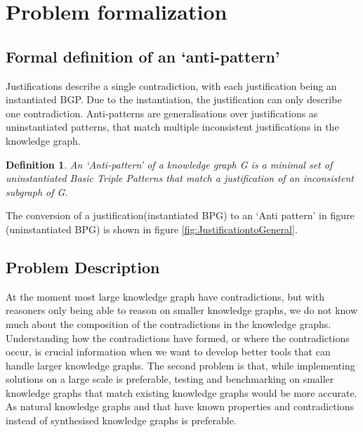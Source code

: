 \documentclass{article}
\newtheorem{definition}{Definition}
\begin{document}
\newpage
\section{Problem formalization}
\subsection{Formal definition of an `anti-pattern'}
Justifications describe a single contradiction, with each justification being an instantiated BGP. Due to the instantiation, the justification can only describe one contradiction. Anti-patterns are generalisations over justifications as uninstantiated patterns, that match  multiple inconsistent justifications in the knowledge graph. 

\begin{definition} 
	An \textit{`Anti-pattern'} \textit{of a knowledge graph G is a minimal set of uninstantiated Basic Triple Patterns that match a justification of an inconsistent subgraph of G.}
\end{definition}

The conversion of a justification(instantiated BPG) to an `Anti pattern' in figure (uninstantiated BPG) is shown in figure  \ref{fig:JustificationtoGeneral}.

\subsection{Problem Description}
At the moment most large knowledge graph have contradictions, but with reasoners only being able to reason on smaller knowledge graphs, we do not know much about the composition of the contradictions in the knowledge graphs. Understanding how the contradictions have formed, or where the contradictions occur, is crucial information when we want to develop better tools that can handle larger knowledge graphs. The second problem is that, while implementing solutions on a large scale is preferable, testing and benchmarking on smaller knowledge graphs that match existing knowledge graphs would be more accurate. As natural knowledge graphs and that have known properties and contradictions instead of synthesised knowledge graphs is preferable. \\
\end{document}
